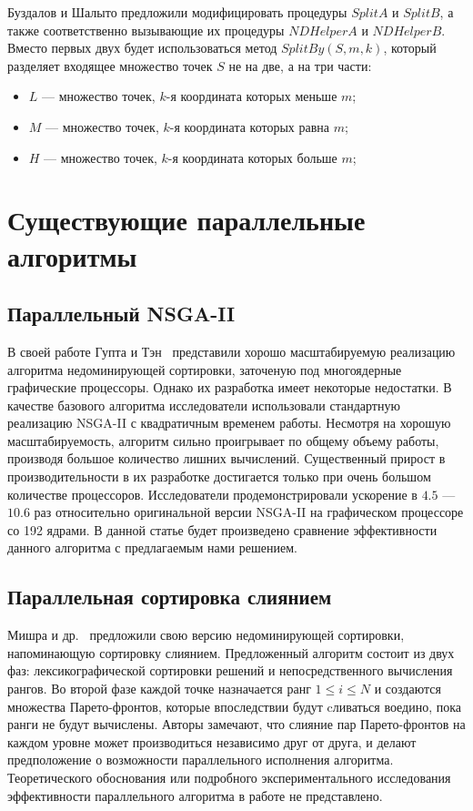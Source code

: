 Буздалов и Шалыто предложили модифицировать процедуры $SplitA$ и $SplitB$, а также соответственно вызывающие их процедуры $NDHelperA$ и $NDHelperB$. Вместо первых двух будет использоваться метод $SplitBy(S, m, k)$, который разделяет входящее множество точек $S$ не на две, а на три части:
\begin{itemize}
    \item $L$ --- множество точек, $k$-я координата которых меньше $m$;
    \item $M$ --- множество точек, $k$-я координата которых равна $m$;
    \item $H$ --- множество точек, $k$-я координата которых больше $m$;
\end{itemize}



\section{Существующие параллельные алгоритмы}
\subsection{Параллельный NSGA-II}
В своей работе Гупта и Тэн~\cite{gupta15} представили хорошо масштабируемую реализацию алгоритма недоминирующей сортировки, заточеную под многоядерные графические процессоры.
Однако их разработка имеет некоторые недостатки. В качестве базового алгоритма исследователи использовали стандартную реализацию NSGA-II с квадратичным временем работы.
Несмотря на хорошую масштабируемость, алгоритм сильно проигрывает по общему объему работы, производя большое количество лишних вычислений.
Существенный прирост в производительности в их разработке достигается только при очень большом количестве процессоров. 
Исследователи продемонстрировали ускорение в $4.5$ --- $10.6$ раз относительно оригинальной версии NSGA-II на графическом процессоре со 192 ядрами.
В данной статье будет произведено сравнение эффективности данного алгоритма с предлагаемым нами решением.

\subsection{Параллельная сортировка слиянием}
Мишра и др.~\cite{mishra16} предложили свою версию недоминирующей сортировки, напоминающую сортировку слиянием.
Предложенный алгоритм состоит из двух фаз: лексикографической сортировки решений и непосредственного вычисления рангов.
Во второй фазе каждой точке назначается ранг $1\leq i \leq N$ и создаются множества Парето-фронтов, которые впоследствии будут cливаться воедино, пока ранги не будут вычислены.
Авторы замечают, что слияние пар Парето-фронтов на каждом уровне может производиться независимо друг от друга, и делают предположение о возможности параллельного исполнения алгоритма.
Теоретического обоснования или подробного экспериментального исследования эффективности параллельного алгоритма в работе не представлено.

